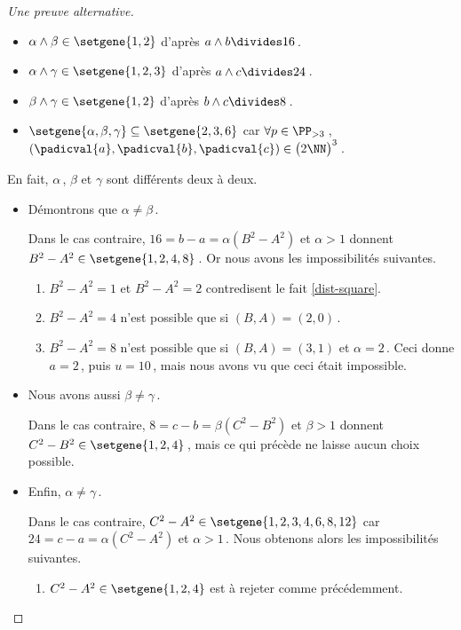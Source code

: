 \begin{proof}[Une preuve alternative]
    \begin{itemize}
		\item $\alpha \wedge \beta \in \setgene{1, 2}$
		d'après $a \wedge b \divides 16$\,.

		\item $\alpha \wedge \gamma \in \setgene{1, 2, 3}$
		d'après $a \wedge c \divides 24$\,.

		\item $\beta \wedge \gamma \in \setgene{1, 2}$
		d'après $b \wedge c \divides 8$\,.

		\item $\setgene{\alpha, \beta, \gamma} \subseteq \setgene{2, 3, 6}$
		car $\forall p \in \PP_{>3}$\,, $(\padicval{a}, \padicval{b}, \padicval{c}) \in \big( 2 \NN \big)^3$\,. 
    \end{itemize}
		


	En fait, $\alpha$\,, $\beta$ et $\gamma$ sont différents deux à deux.
	
    \begin{itemize}	
		\item Démontrons que $\alpha \neq \beta$\,. 
		
		\noindent
		Dans le cas contraire, $16 = b - a = \alpha(B^2 - A^2)$ et $\alpha > 1$ donnent $B^2 - A^2 \in \setgene{1, 2, 4, 8}$\,.
		Or nous avons les impossibilités suivantes.
		\begin{enumerate}
			\item $B^2 - A^2 = 1$  et $B^2 - A^2 = 2$ contredisent le fait \ref{dist-square}.
			\item $B^2 - A^2 = 4$ n'est possible que si $(B, A) = (2, 0)$\,.
			\item $B^2 - A^2 = 8$ n'est possible que si $(B, A) = (3, 1)$ et $\alpha = 2$\,.
			Ceci donne $a = 2$\,, puis $u = 10$\,, mais nous avons vu que ceci était impossible.
		\end{enumerate}
		

		\item Nous avons aussi $\beta \neq \gamma$\,. 
		
		\noindent
		Dans le cas contraire, $8 = c - b = \beta(C^2 - B^2)$ et $\beta > 1$ donnent $C^2 - B^2 \in \setgene{1, 2, 4}$\,, mais ce qui précède ne laisse aucun choix possible.
		

		\item Enfin, $\alpha \neq \gamma$\,. 
		
		\noindent
		Dans le cas contraire,
		$C^2 - A^2 \in \setgene{1, 2, 3, 4, 6, 8, 12}$
		car 
		$24 = c - a = \alpha(C^2 - A^2)$ et $\alpha > 1$\,.
		Nous obtenons alors les impossibilités suivantes.
		\begin{enumerate}
			\item $C^2 - A^2 \in \setgene{1, 2, 4}$ est à rejeter comme précédemment.
			

\end{enumerate}
\end{itemize}
\end{proof}

